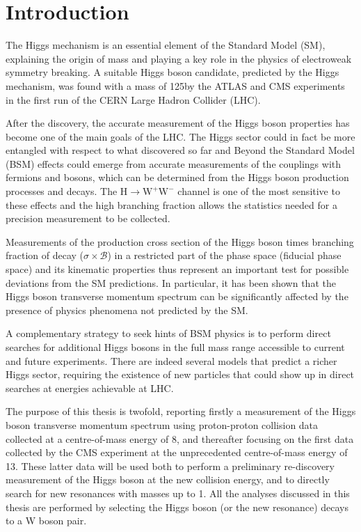 \chapter*{Introduction}
\thispagestyle{empty}

The Higgs mechanism is an essential element of the Standard Model (SM), explaining the origin of mass and playing a key role in the physics of electroweak symmetry breaking. A suitable Higgs boson candidate, predicted by the Higgs mechanism, was found with a mass of 125\GeV by the ATLAS and CMS experiments in the first run of the CERN Large Hadron Collider (LHC).

After the discovery, the accurate measurement of the Higgs boson properties has become one of the main goals of the LHC. The Higgs sector could in fact be more entangled with respect to what discovered so far and Beyond the Standard Model (BSM) effects could emerge from accurate measurements of the couplings with fermions and bosons, which can be determined from the Higgs boson production processes and decays. The $\mathrm{H \to W^+W^-}$ channel is one of the most sensitive to these effects and the high branching fraction allows the statistics needed for a precision measurement to be collected.

Measurements of the production cross section of the Higgs boson times branching fraction of decay ($\sigma\times\mathcal{B}$) in a restricted part of the phase space (fiducial phase space) and its kinematic properties thus represent an important test for possible deviations from the SM predictions.
In particular, it has been shown that the Higgs boson transverse momentum spectrum can be significantly affected by the presence of physics phenomena not predicted by the SM. %

A complementary strategy to seek hints of BSM physics is to perform direct searches for additional Higgs bosons in the full mass range accessible to current and future experiments. There are indeed several models that predict a richer Higgs sector, requiring the existence of new particles that could show up in direct searches at energies achievable at LHC.

The purpose of this thesis is twofold, reporting firstly a measurement of the Higgs boson transverse momentum spectrum using proton-proton collision data collected at a centre-of-mass energy of 8\TeV, and thereafter focusing on the first data collected by the CMS experiment at the unprecedented centre-of-mass energy of 13\TeV. These latter data will be used both to perform a preliminary re-discovery measurement of the Higgs boson at the new collision energy, and to directly search for new resonances with masses up to 1\TeV. All the analyses discussed in this thesis are performed by selecting the Higgs boson (or the new resonance) decays to a W boson pair.

